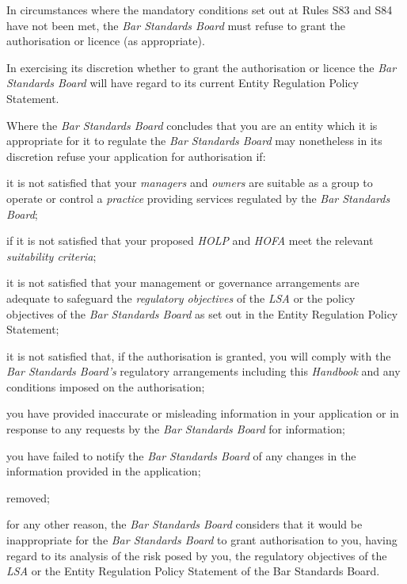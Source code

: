 
In circumstances where the mandatory conditions set out at Rules S83 and
S84 have not been met, the \emph{Bar Standards Board} must refuse to
grant the authorisation or licence (as appropriate).





In exercising its discretion whether to grant the authorisation or
licence the \emph{Bar Standards Board} will have regard to its current
Entity Regulation Policy Statement.




Where the \emph{Bar Standards Board} concludes that you are an entity
which it is appropriate for it to regulate the \emph{Bar Standards
Board} may nonetheless in its discretion refuse your application for
authorisation if:\nl\item it is not satisfied that your \emph{managers} and \emph{owners} are
suitable as a group to operate or control a \emph{practice} providing
services regulated by the \emph{Bar Standards Board};
\item if it is not satisfied that your proposed \emph{HOLP} and \emph{HOFA}
meet the relevant \emph{suitability criteria};
\item it is not satisfied that your management or governance arrangements
are adequate to safeguard the \emph{regulatory objectives} of the
\emph{LSA} or the policy objectives of the \emph{Bar Standards Board} as
set out in the Entity Regulation Policy Statement;
\item it is not satisfied that, if the authorisation is granted, you will
comply with the \emph{Bar Standards Board's} regulatory arrangements
including this \emph{Handbook} and any conditions imposed on the
authorisation;
\item you have provided inaccurate or misleading information in your
application or in response to any requests by the \emph{Bar Standards
Board} for information;
\item you have failed to notify the \emph{Bar Standards Board} of any
changes in the information provided in the application;
\item removed;
\item for any other reason, the \emph{Bar Standards Board} considers that
it would be inappropriate for the \emph{Bar Standards Board} to grant
authorisation to you, having regard to its analysis of the risk posed by
you, the regulatory objectives of the \emph{LSA} or the Entity
Regulation Policy Statement of the Bar Standards Board.
\ln

